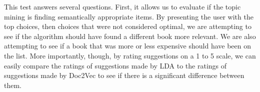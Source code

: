 This test answers several questions.  
First, it allows us to evaluate if the topic mining is finding semantically appropriate items.  
By presenting the user with the top choices, then choices that were not considered optimal, we are attempting to see if the algorithm should have found a different book more relevant.  
We are also attempting to see if a book that was more or less expensive should have been on the list.  
More importantly, though, by rating suggestions on a 1 to 5 scale, we can easily compare the ratings of suggestions made by LDA to the ratings of suggestions made by Doc2Vec to see if there is a significant difference between them.  
